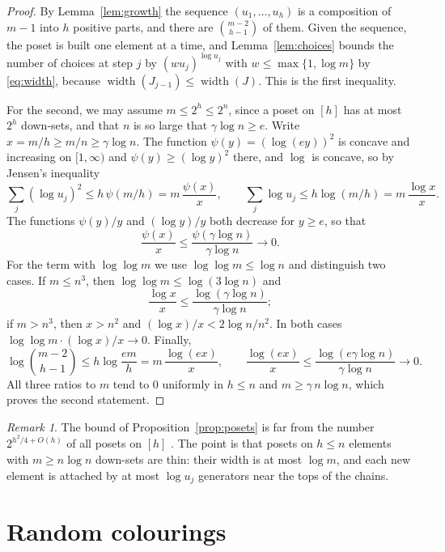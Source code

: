 \documentclass[11pt,reqno]{amsart}
\numberwithin{equation}{section}
\theoremstyle{plain}
\theoremstyle{definition}
\theoremstyle{remark}
\newtheorem{remark}[theorem]{Remark}
\DeclareMathOperator{\width}{width}
\begin{document}
\begin{proof}
By Lemma~\ref{lem:growth} the sequence $(u_1,\dots,u_h)$ is a composition
of $m-1$ into $h$ positive parts, and there are $\binom{m-2}{h-1}$ of them.
Given the sequence, the poset is built one element at a time, and
Lemma~\ref{lem:choices} bounds the number of choices at step $j$ by
$(wu_j)^{\log u_j}$ with $w\le\max\{1,\log m\}$ by \eqref{eq:width},
because $\width(J_{j-1})\le\width(J)$. This is the first inequality.

For the second, we may assume $m\le2^{h}\le2^{n}$, since a poset on $[h]$
has at most $2^{h}$ down-sets, and that $n$ is so large that $\gamma\log n\ge e$. Write $x=m/h\ge m/n\ge\gamma\log n$.
The function $\psi(y)=(\log(ey))^{2}$ is concave and increasing on
$[1,\infty)$ and $\psi(y)\ge(\log y)^{2}$ there, and $\log$ is concave, so
by Jensen's inequality
\[
\sum_j(\log u_j)^{2}\le h\,\psi(m/h)=m\,\frac{\psi(x)}{x},\qquad
\sum_j\log u_j\le h\log(m/h)=m\,\frac{\log x}{x}.
\]
The functions $\psi(y)/y$ and $(\log y)/y$ both decrease for $y\ge e$,
so that
\[
\frac{\psi(x)}{x}\le\frac{\psi(\gamma\log n)}{\gamma\log n}\longrightarrow0.
\]
For the term with $\log\log m$ we use $\log\log m\le\log n$ and
distinguish two cases. If $m\le n^{3}$, then $\log\log m\le\log(3\log n)$
and
\[
\frac{\log x}{x}\le\frac{\log(\gamma\log n)}{\gamma\log n};
\]
if $m>n^{3}$, then $x>n^{2}$ and $(\log x)/x<2\log n/n^{2}$. In both cases
$\log\log m\cdot(\log x)/x\to0$. Finally,
\[
\log\binom{m-2}{h-1}\le h\log\frac{em}{h}=m\,\frac{\log(ex)}{x},\qquad
\frac{\log(ex)}{x}\le\frac{\log(e\gamma\log n)}{\gamma\log n}\to0 .
\]
All three ratios to $m$ tend to $0$ uniformly in $h\le n$ and
$m\ge\gamma\,n\log n$, which proves the second
statement.
\end{proof}

\begin{remark}
\label{rem:posetcount}
The bound of Proposition~\ref{prop:posets} is far from the number
$2^{h^{2}/4+O(h)}$ of all posets on $[h]$ \cite{KR75}. The point is that
posets on $h\le n$ elements with $m\ge n\log n$ down-sets are thin: their
width is at most $\log m$, and each new element is attached by at most
$\log u_j$ generators near the tops of the chains.
\end{remark}

\section{Random colourings}
\label{sec:random}
\end{document}
